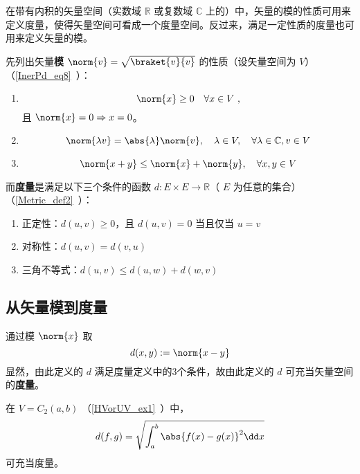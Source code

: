 

在带有内积的矢量空间（实数域 $\mathbb R$ 或复数域 $\mathbb C$ 上的）中，矢量的模的性质可用来定义度量，使得矢量空间可看成一个度量空间。反过来，满足一定性质的度量也可用来定义矢量的模。

先列出矢量\textbf{模} $\norm{v}=\sqrt{\braket{v}{v}}$ 的性质（设矢量空间为 $V$）（\autoref{InerPd_eq8}~）：
\begin{enumerate}
\item 
\begin{equation}\label{SNadM_eq1}
\norm{x}\geq 0\quad \forall x\in V~,
\end{equation}
且 $\norm{x}=0\Rightarrow x=0$。
\item \begin{equation}\label{SNadM_eq2}
\norm{\lambda v}=\abs{\lambda}\norm{v},\quad \lambda\in V,\quad\forall\lambda\in\mathbb C,v\in V
\end{equation}
\item 
\begin{equation}
\norm{x+y}\leq\norm{x}+\norm{y},\quad \forall x,y\in V
\end{equation}
\end{enumerate}

而\textbf{度量}是满足以下三个条件的函数 $d:E\times E\rightarrow\mathbb R$（ $E$ 为任意的集合）（\autoref{Metric_def2}~）：
\begin{enumerate}
\item 正定性：$d(u, v) \geq 0$，且 $d(u, v)=0$ 当且仅当 $u=v$
\item 对称性：$d(u, v) = d(v, u)$
\item 三角不等式：$d(u, v) \leqslant d(u, w) + d(w, v)$
\end{enumerate}
\subsection{从矢量模到度量}
通过模 $\norm{x}$ 取
\begin{equation}
d(x,y):=\norm{x-y}
\end{equation}
显然，由此定义的 $d$ 满足度量定义中的3个条件，故由此定义的 $d$ 可充当矢量空间的\textbf{度量}。
\begin{example}{}
在 $V=C_2(a,b)$ （\autoref{HVorUV_ex1}~）中，
\begin{equation}
d(f,g)=\sqrt{\int_a^b\abs{f(x)-g(x)}^2\dd x}
\end{equation}
可充当度量。
\end{example}
